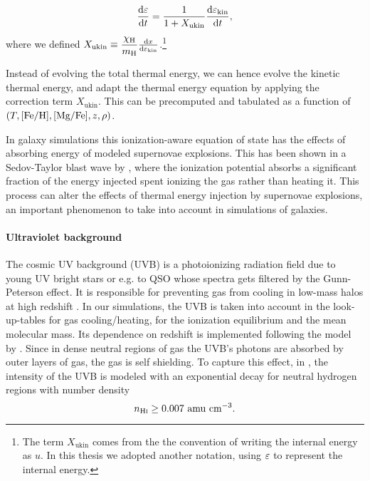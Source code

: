 \begin{equation}
\dv{\varepsilon}{t} = \dfrac{1}{ 1 + X_\text{ukin}} \dv{\varepsilon_\text{kin}}{t},
\end{equation}
where we defined $X_\text{ukin} \equiv \dfrac{\chi_\text H}{m_\text H} \dv{x}{\varepsilon_\text{kin}}$.\footnote{The term $X_\text{ukin}$ comes from the the convention of writing the internal energy as $u$. In this thesis we adopted another notation, using $\varepsilon$ to represent the internal energy.}

Instead of evolving the total thermal energy, we can hence evolve the kinetic thermal energy, and adapt the thermal energy equation by applying the correction term $X_\text{ukin}$.
This can be precomputed and tabulated as a function of $(T, [\text{Fe}/\text{H}], [\text{Mg}/\text{Fe}], z, \rho)$.

In galaxy simulations this ionization-aware equation of state has the effects of absorbing energy of modeled supernovae explosions.
This has been shown in a Sedov-Taylor blast wave by \citet{Vandenbroucke2013}, where the ionization potential absorbs a significant fraction of the energy injected spent ionizing the gas rather than heating it.
This process can alter the effects of thermal energy injection by supernovae explosions, an important phenomenon to take into account in simulations of galaxies.

\paragraph{Ultraviolet background}
The cosmic UV background (UVB) is a photoionizing radiation field due to young UV bright stars or e.g. to QSO whose spectra gets filtered by the Gunn-Peterson effect. It is responsible for preventing gas from cooling in low-mass halos at high redshift \citep{Efstathiou1992, Navarro1997}.
In our simulations, the UVB is taken into account in the look-up-tables for gas cooling/heating, for the ionization equilibrium and the mean molecular mass. Its dependence on redshift is implemented following the model by \citet{Faucher-Giguere2009}.
Since in dense neutral regions of gas the UVB's photons are absorbed by outer layers of gas, the gas is self shielding. To capture this effect, in \citet{DeRijcke2013}, the intensity of the UVB is modeled with an exponential decay for neutral hydrogen regions with number density \[n_{\text{H}\textsc i} \geq 0.007 \text{~amu~cm}^{-3}.\]



